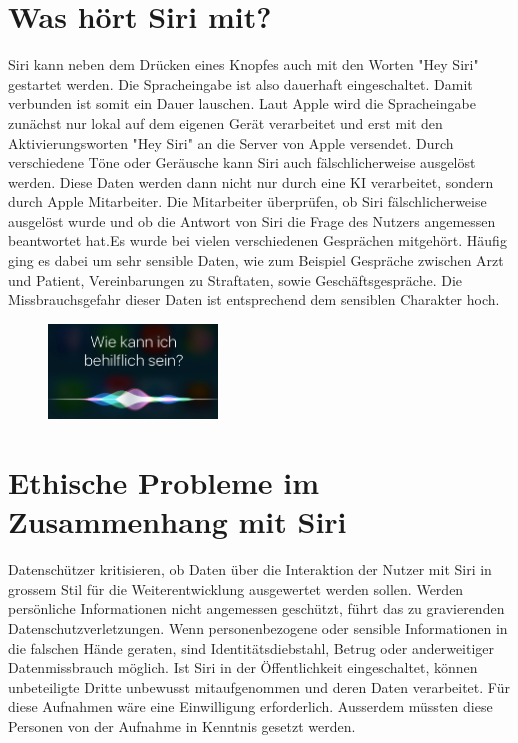 \documentclass{article}
\begin{document}
\section{Was hört Siri mit?}
Siri kann neben dem Drücken eines Knopfes auch mit den Worten "Hey Siri" gestartet werden. Die Spracheingabe ist also dauerhaft eingeschaltet. Damit verbunden ist somit ein Dauer lauschen. Laut Apple wird die Spracheingabe zunächst nur lokal auf dem eigenen Gerät verarbeitet und erst mit den Aktivierungsworten "Hey Siri" an die Server von Apple versendet. Durch verschiedene Töne oder Geräusche kann Siri auch fälschlicherweise ausgelöst werden. Diese Daten werden dann nicht nur durch eine KI verarbeitet, sondern durch Apple Mitarbeiter. Die Mitarbeiter überprüfen, ob Siri fälschlicherweise ausgelöst wurde und ob die Antwort von Siri die Frage des Nutzers angemessen beantwortet hat.Es wurde bei vielen verschiedenen Gesprächen mitgehört. Häufig ging es dabei um sehr sensible Daten, wie zum Beispiel Gespräche zwischen Arzt und Patient, Vereinbarungen zu Straftaten, sowie Geschäftsgespräche. Die Missbrauchsgefahr dieser Daten ist entsprechend dem sensiblen Charakter hoch.

\begin{figure}[ht]
    \centering
    \includegraphics[width=0.4\textwidth]{Spracherkennung.jpg}
    \label{fig:Spracherkennung}
    \end{figure}


\section{Ethische Probleme im Zusammenhang mit Siri}
Datenschützer kritisieren, ob Daten über die Interaktion der Nutzer mit Siri in grossem Stil für die Weiterentwicklung ausgewertet werden sollen. Werden persönliche Informationen nicht angemessen geschützt, führt das zu gravierenden Datenschutzverletzungen. Wenn personenbezogene oder sensible Informationen in die falschen Hände geraten, sind Identitätsdiebstahl, Betrug oder anderweitiger Datenmissbrauch möglich. Ist Siri in der Öffentlichkeit eingeschaltet, können unbeteiligte Dritte unbewusst mitaufgenommen und deren Daten verarbeitet.
Für diese Aufnahmen wäre eine Einwilligung erforderlich. Ausserdem müssten diese Personen von der Aufnahme in Kenntnis gesetzt werden.
\end{document}
